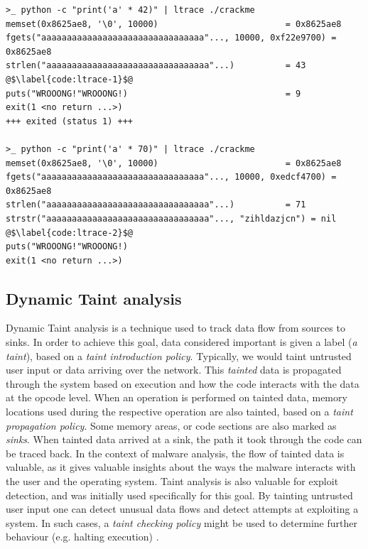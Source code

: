 \begin{lstlisting}[caption={ltrace (``a library call tracer'') output of an obfuscated crackme. One can observe a length check in the first execution, and different output when an input of the expected length is provided.}, label={code:ltrace}]
>_ python -c "print('a' * 42)" | ltrace ./crackme
memset(0x8625ae8, '\0', 10000)                         = 0x8625ae8
fgets("aaaaaaaaaaaaaaaaaaaaaaaaaaaaaaaa"..., 10000, 0xf22e9700) = 0x8625ae8
strlen("aaaaaaaaaaaaaaaaaaaaaaaaaaaaaaaa"...)          = 43 @$\label{code:ltrace-1}$@
puts("WROOONG!"WROOONG!)                               = 9
exit(1 <no return ...>)
+++ exited (status 1) +++

>_ python -c "print('a' * 70)" | ltrace ./crackme
memset(0x8625ae8, '\0', 10000)                         = 0x8625ae8
fgets("aaaaaaaaaaaaaaaaaaaaaaaaaaaaaaaa"..., 10000, 0xedcf4700) = 0x8625ae8
strlen("aaaaaaaaaaaaaaaaaaaaaaaaaaaaaaaa"...)          = 71
strstr("aaaaaaaaaaaaaaaaaaaaaaaaaaaaaaaa"..., "zihldazjcn") = nil @$\label{code:ltrace-2}$@
puts("WROOONG!"WROOONG!)
exit(1 <no return ...>)
\end{lstlisting}

\subsection{Dynamic Taint analysis}

Dynamic Taint analysis is a technique used to track data flow from sources to sinks. In order to achieve this goal, data considered important is given a label (\emph{a taint}), based on a \emph{taint introduction policy}. Typically, we would taint untrusted user input or data arriving over the network. This \emph{tainted} data is propagated through the system based on execution and how the code interacts with the data at the opcode level. When an operation is performed on tainted data, memory locations used during the respective operation are also tainted, based on a \emph{taint propagation policy}. Some memory areas, or code sections are also marked as \emph{sinks}. When tainted data arrived at a sink, the path it took through the code can be traced back. In the context of malware analysis, the flow of tainted data is valuable, as it gives valuable insights about the ways the malware interacts with the user and the operating system. Taint analysis is also valuable for exploit detection, and was initially used specifically for this goal. By tainting untrusted user input one can detect unusual data flows and detect attempts at exploiting a system. In such cases, a \emph{taint checking policy} might be used to determine further behaviour (e.g. halting execution) \cite{da_survey_2019} \cite{all_about_taint_2010}.

